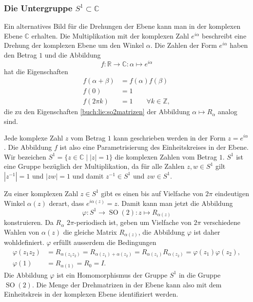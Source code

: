\subsubsection{Die Untergruppe $S^1\subset\mathbb{C}$}
Ein alternatives Bild für die Drehungen der Ebene kann man in der komplexen
Ebene $\mathbb{C}$ erhalten.
Die Multiplikation mit der komplexen Zahl $e^{i\alpha}$ beschreibt eine
Drehung der komplexen Ebene um den Winkel $\alpha$.
Die Zahlen der Form $e^{i\alpha}$ haben den Betrag $1$ und die Abbildung
\[
f\colon \mathbb{R}\to \mathbb{C}:\alpha \mapsto e^{i\alpha}
\]
hat die Eigenschaften
\begin{equation}
\begin{aligned}
f(\alpha+\beta) &= f(\alpha)f(\beta)
\\
f(0)&=1
\\
f(2\pi k)&=1\qquad\forall k\in\mathbb{Z},
\end{aligned}
\label{buch:lie:so2komplex}
\end{equation}
die zu den Eigenschaften
\eqref{buch:lie:so2matrizen} der Abbildung $\alpha\mapsto R_{\alpha}$ 
analog sind.

Jede komplexe Zahl $z$ vom Betrag $1$ kann geschrieben werden in der Form
$z=e^{i\alpha}$.
Die Abbildung $f$ ist also eine Parametrisierung des
Einheitskreises in der Ebene.
Wir bezeichen $S^1=\{z\in\mathbb{C} \mid |z|=1\}$ die komplexen Zahlen vom
Betrag $1$.
$S^1$ ist eine Gruppe bezüglich der Multiplikation, da für alle Zahlen
$z,w\in S^1$ gilt
$|z^{-1}|=1$ und $|zw|=1$ und damit $z^{-1}\in S^1$ und $zw\in S^1$.

Zu einer komplexen Zahl $z\in S^1$ gibt es einen bis auf Vielfache
von $2\pi$ eindeutigen Winkel $\alpha(z)$ derart, dass $e^{i\alpha(z)}=z$.
Damit kann man jetzt die Abbildung
\[
\varphi
\colon
S^1\to \operatorname{SO}(2)
:
z\mapsto  R_{\alpha(z)}
\]
konstruieren.
Da $R_{\alpha}$ $2\pi$-periodisch ist, geben um Vielfache
von $2\pi$ verschiedene Wahlen von $\alpha(z)$ die gleiche
Matrix $R_{\alpha(z)}$, die Abbildung $\varphi$ ist daher
wohldefiniert.
$\varphi$ erfüllt ausserdem die Bedingungen
\begin{align*}
\varphi(z_1z_2)
&=
R_{\alpha(z_1z_2)}
=
R_{\alpha(z_1)+\alpha(z_2)}
=
R_{\alpha(z_1)}R_{\alpha(z_2)}
=
\varphi(z_1)\varphi(z_2),
\\
\varphi(1)
&=
R_{\alpha(1)}
=
R_0
=
I.
\end{align*}
Die Abbildung $\varphi$ ist ein Homomorphismus der Gruppe $S^1$
in die Gruppe $\operatorname{SO}(2)$.
Die Menge der Drehmatrizen in der Ebene kann also mit dem Einheitskreis
in der komplexen Ebene identifiziert werden.


